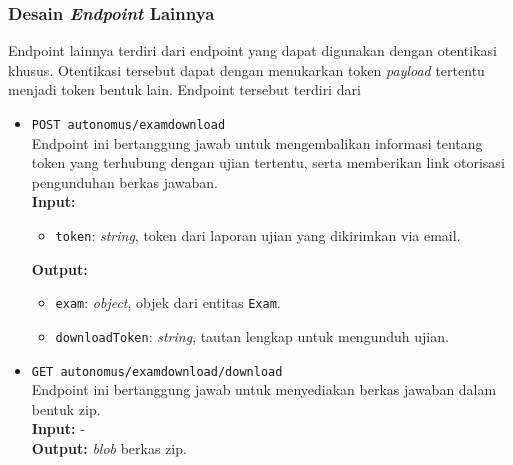 \subsubsection{Desain \textit{Endpoint} Lainnya} Endpoint lainnya terdiri dari
    endpoint yang dapat digunakan dengan otentikasi khusus. Otentikasi tersebut
    dapat dengan menukarkan token \textit{payload} tertentu menjadi token bentuk
    lain. Endpoint tersebut terdiri dari
    \begin{itemize}
        \item \texttt{POST autonomus/examdownload} \\
            Endpoint ini bertanggung jawab untuk mengembalikan informasi tentang
            token yang terhubung dengan ujian tertentu, serta memberikan link
            otorisasi pengunduhan berkas jawaban.\\
            \textbf{Input:} \begin{itemize}
                \item \texttt{token}: \textit{string}, token dari laporan ujian
                    yang dikirimkan via email.
            \end{itemize}
            \textbf{Output:} \begin{itemize}
                \item \texttt{exam}: \textit{object}, objek dari entitas
                \texttt{Exam}.
                \item \texttt{downloadToken}: \textit{string}, tautan lengkap
                    untuk mengunduh ujian.
            \end{itemize}
            
        \item \texttt{GET autonomus/examdownload/download} \\
            Endpoint ini bertanggung jawab untuk menyediakan berkas jawaban
            dalam bentuk zip.\\
            \textbf{Input:} -\\
            \textbf{Output:} \textit{blob} berkas zip.
    \end{itemize}
    
